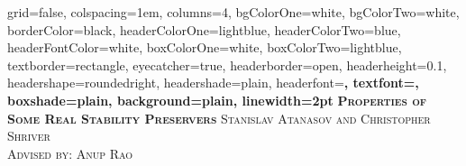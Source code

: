 \documentclass[landscape,final,a0paper,fontscale=0.27]{baposter}
\begin{document}
\begin{poster}%
  {
  grid=false,
  colspacing=1em,
  columns=4,
  bgColorOne=white,
  bgColorTwo=white,
  borderColor=black,
  headerColorOne=lightblue,
  headerColorTwo=blue,
  headerFontColor=white,
  boxColorOne=white,
  boxColorTwo=lightblue,
  textborder=rectangle,
  eyecatcher=true,
  headerborder=open,
  headerheight=0.1\textheight,
  headershape=roundedright,
  headershade=plain,
  headerfont=\Large\bf\textsc, %
  textfont={\setlength{\parindent}{1.5em}},
  boxshade=plain,
  background=plain,
  linewidth=2pt
  }
  {\bf\textsc{Properties of Some Real Stability Preservers}\vspace{0.5em}}
  {\textsc{ Stanislav Atanasov and Christopher Shriver\\ Advised by: Anup Rao}}
  {%

\setlength{\fboxsep}{0pt}%
\setlength{\fboxrule}{3pt}%
  }

    \newcommand{\colouredcircle}{%
      \tikz{\useasboundingbox (-0.2em,-0.32em) rectangle(0.2em,0.32em); \draw[draw=black,fill=lightblue,line width=0.03em] (0,0) circle(0.18em);}}




\end{poster}
\end{document}
